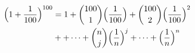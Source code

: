 \documentclass[preview]{standalone}
\begin{document}
\begin{align*}
\Big( 1 + {1 \over 100}\Big)^{100} &= 1 + {100 \choose 1} \Big( {1 \over 100} \Big) + {100 \choose 2} \Big( {1 \over 100} \Big)^2 \\&+ + \cdots + {n \choose j} \Big( {1 \over n} \Big)^j + \cdots + \Big( {1 \over n} \Big)^n
\end{align*}
\end{document}
